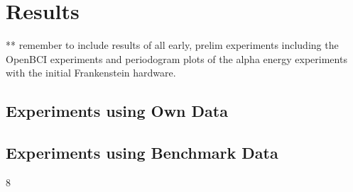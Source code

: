 \chapter{Results}
\label{chapter:results}

\graphicspath{ {report/Chapter6/assets/} } 

** remember to include results of all early, prelim experiments including the OpenBCI experiments and periodogram plots of the alpha energy experiments with the initial Frankenstein hardware.

\section{Experiments using Own Data}

\section{Experiments using Benchmark Data}
8